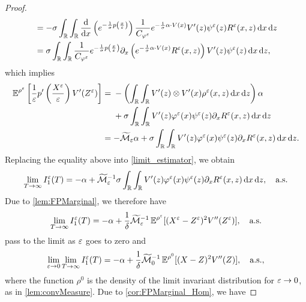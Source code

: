 \documentclass[review,onefignum,onetabnum]{siamonline190516}
\begin{document}
\begin{proof}
\begin{equation}
\begin{aligned}
	&= -\sigma \int_{\mathbb{R}} \int_{\mathbb{R}} \frac{\mathrm{d}}{\mathrm{d} x}\left( e^{ - \frac{1}{\sigma} p \left ( \frac{x}{\varepsilon} \right)} \right) \frac{1}{C_{\varphi^\varepsilon}} e^{- \frac{1}{\sigma} \alpha \cdot V(x)} V'(z) \psi^\varepsilon(z) R^\varepsilon(x,z) \,\mathrm{d} x \,\mathrm{d} z \\
	&= \sigma \int_{\mathbb{R}} \int_{\mathbb{R}} \frac{1}{C_{\varphi^\varepsilon}} e^{ - \frac{1}{\sigma} p \left ( \frac{x}{\varepsilon} \right)} \partial_x \left ( e^{- \frac{1}{\sigma} \alpha \cdot V(x)} R^\varepsilon(x,z) \right ) V'(z) \psi^\varepsilon(z) \,\mathrm{d} x \,\mathrm{d} z,
\end{aligned}
\end{equation}
which implies
\begin{align}
	\operatorname{\mathbb{E}}^{\rho^\varepsilon} \left [ \frac{1}{\varepsilon} p' \left ( \frac{X^\varepsilon}{\varepsilon} \right ) V'(Z^\varepsilon) \right ] &= 
	\begin{aligned}[t]
		&- \left(\int_{\mathbb{R}} \int_{\mathbb{R}} V'(z) \otimes V'(x) \rho^\varepsilon(x, z) \,\mathrm{d} x \,\mathrm{d} z\right) \alpha \\
		&+\sigma \int_{\mathbb{R}} \int_{\mathbb{R}} V'(z) \varphi^\varepsilon(x) \psi^\varepsilon(z) \partial_x R^\varepsilon(x,z) \,\mathrm{d} x \,\mathrm{d} z 
	\end{aligned}
	\\
	&= - \widetilde {\mathcal M}_\varepsilon\alpha + \sigma \int_{\mathbb{R}} \int_{\mathbb{R}} V'(z) \varphi^\varepsilon(x) \psi^\varepsilon(z) \partial_x R^\varepsilon(x,z) \,\mathrm{d} x \,\mathrm{d} z.
\end{align}
Replacing the equality above into \eqref{limit_estimator}, we obtain
\begin{equation}
\lim_{T \to \infty} I_1^\varepsilon(T) = -\alpha + \widetilde {\mathcal M}_\varepsilon^{-1} \sigma \int_{\mathbb{R}} \int_{\mathbb{R}} V'(z) \varphi^\varepsilon(x) \psi^\varepsilon(z) \partial_x R^\varepsilon(x,z) \,\mathrm{d} x \,\mathrm{d} z, \quad \text{a.s.}
\end{equation}
Due to \cref{lem:FPMarginal}, we therefore have
\begin{equation} \label{eq:for_zeta}
	\lim_{T \to \infty} I_1^\epl(T) = -\alpha + \frac1\delta \widetilde {\mathcal M}_\epl^{-1} \E^{\rho^\epl}[(X^\epl - Z^\epl)^2 V''(Z^\epl)], \quad \text{a.s.}	
\end{equation}
 pass to the limit as $\varepsilon$ goes to zero and
\begin{equation} \label{eq:limit_estimator_2}
	\lim_{\epl \to 0} \lim_{T \to \infty} I_1^\epl(T) = -\alpha + \frac1\delta \widetilde {\mathcal M}_0^{-1} \E^{\rho^0}[(X - Z)^2 V''(Z)], \quad \text{a.s.},
\end{equation}
where the function $\rho^0$ is the density of the limit invariant distribution for $\varepsilon \to 0$, as in \cref{lem:convMeasure}. Due to \cref{cor:FPMarginal_Hom}, we have

\end{proof}
\end{document}
